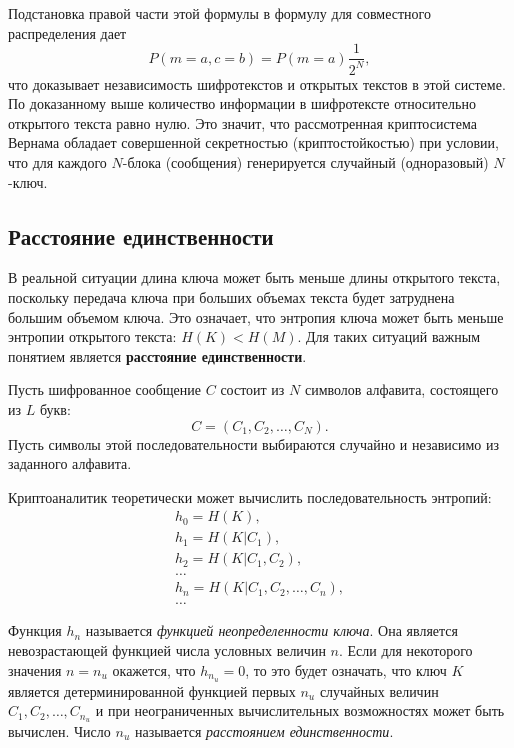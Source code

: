 Подстановка правой части этой формулы в формулу для совместного распределения дает
    \[ P(m=a,c=b)=P(m=a)\frac{1}{2^N}, \]
что доказывает независимость шифротекстов и открытых текстов в этой системе. По доказанному выше количество информации в шифротексте относительно открытого текста равно нулю. Это значит, что рассмотренная криптосистема Вернама обладает совершенной секретностью (криптостойкостью) при условии, что для каждого $N$-блока (сообщения) генерируется случайный (одноразовый) $N$-ключ.


\subsection{Расстояние единственности}

В реальной ситуации длина ключа может быть меньше длины открытого текста, поскольку передача ключа при больших объемах текста будет затруднена большим объемом ключа. Это означает, что энтропия ключа может быть меньше энтропии открытого текста: $H(K)< H(M)$. Для таких ситуаций важным понятием является \textbf{расстояние единственности}.

Пусть шифрованное сообщение $C$ состоит из $N$ символов алфавита, состоящего из $L$ букв:
\[
    C = (C_1, C_2, \dots, C_N).
\]
Пусть символы этой последовательности выбираются случайно и независимо из заданного алфавита.

Криптоаналитик теоретически может вычислить последовательность энтропий:
\[ \begin{array}{l}
    h_0 = H(K), \\
    h_1 = H(K | C_1), \\
    h_2 = H(K | C_1, C_2), \\
    \dots \\
    h_n = H(K | C_1, C_2, \dots, C_n), \\
    \dots
\end{array} \]

Функция $h_n$ называется \emph{функцией неопределенности ключа}. Она является невозрастающей функцией числа условных величин $n$. Если для некоторого значения $n = n_u$ окажется, что $h_{n_u} = 0$, то это будет означать, что ключ $K$ является детерминированной функцией первых $n_u$ случайных величин $C_1, C_2, \dots, C_{n_u}$ и при неограниченных вычислительных возможностях может быть вычислен. Число $n_u$ называется \emph{расстоянием единственности}.

